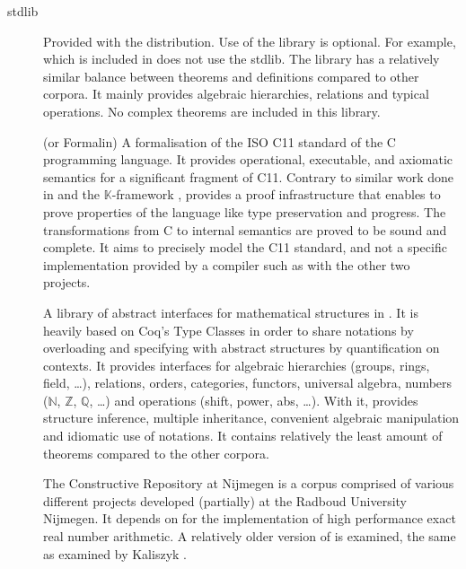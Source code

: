 \begin{description}
  \item[\coq stdlib]
    Provided with the \coq distribution.
    Use of the library is optional.
    For example, \ssreflect which is included in \mathcomp does not use the \coq stdlib.
    The library has a relatively similar balance between theorems and definitions compared to other corpora.
    It mainly provides algebraic hierarchies, relations and typical operations.
    No complex theorems are included in this library.
  \item[\formalin]
    (or Formalin) \cite{krebbers2015typed}
    A formalisation of the ISO C11 standard of the C programming language.
    It provides operational, executable, and axiomatic semantics for a significant fragment of C11.
    Contrary to similar work done in \compcert \cite{leroy2009formally} and the $\mathbb{K}$-framework \cite{roșu2010overview}, \formalin provides a proof infrastructure that enables to
    prove properties of the language like type preservation and progress.
    The transformations from C to internal semantics are proved to be sound and complete.
    It aims to precisely model the C11 standard, and not a specific implementation provided by a compiler such as with the other two projects.
  \item[\mathclasses] \cite{spitters2011type} \cite{krebbers2011type} \cite{krebbers2011computer}
    A library of abstract interfaces for mathematical structures in \coq.
    It is heavily based on Coq's Type Classes \cite{sozeau2008first} in order to share notations by overloading and specifying with abstract structures by quantification on contexts.
    It provides interfaces for algebraic hierarchies (groups, rings, field, \ldots),
    relations, orders, categories, functors, universal algebra,
    numbers ($\mathbb{N}$, $\mathbb{Z}$, $\mathbb{Q}$, \ldots)
    and operations (shift, power, abs, \ldots).
    With it, \mathclasses provides structure inference, multiple inheritance, convenient algebraic manipulation
    and idiomatic use of notations.
    It contains relatively the least amount of theorems compared to the other corpora.
  \item[\corn]
    The \coq Constructive Repository at Nijmegen is a corpus comprised of various different projects developed (partially) at the Radboud University Nijmegen.
    It depends on \mathclasses for the implementation of high performance exact real number arithmetic.
    A relatively older version of \corn is examined, the same as examined by Kaliszyk \cite{kaliszyk2014machine}.

\end{description}

